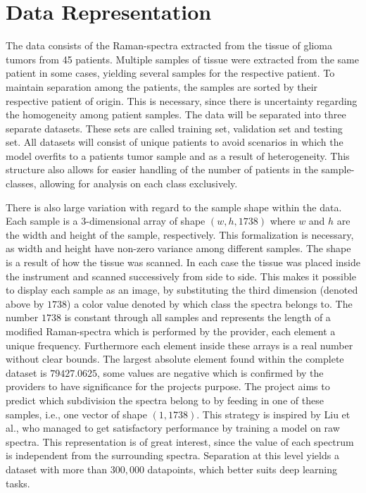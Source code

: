 \section{Data Representation}
The data consists of the Raman-spectra extracted from the tissue of glioma tumors from 45 patients. Multiple samples of tissue were extracted from the same patient in some cases, yielding several samples for the respective patient. To maintain separation among the patients, the samples are sorted by their respective patient of origin. This is necessary, since there is uncertainty regarding the homogeneity among patient samples. The data will be separated into three separate datasets. These sets are called training set, validation set and testing set. All datasets will consist of unique patients to avoid scenarios in which the model overfits to a patients tumor sample and as a result of heterogeneity. This structure also allows for easier handling of the number of patients in the sample-classes, allowing for analysis on each class exclusively. 

There is also large variation with regard to the sample shape within the data. Each sample is a 3-dimensional array of shape $(w, h, 1738)$ where $w$ and $h$ are the width and height of the sample, respectively. This formalization is necessary, as width and height have non-zero variance among different samples. The shape is a result of how the tissue was scanned. In each case the tissue was placed inside the instrument and scanned successively from side to side. This makes it possible to display each sample as an image, by substituting the third dimension (denoted above by $1738$) a color value denoted by which class the spectra belongs to. The number $1738$ is constant through all samples and represents the length of a modified Raman-spectra which is performed by the provider, each element a unique frequency. Furthermore each element inside these arrays is a real number without clear bounds. The largest absolute element found within the complete dataset is $79427.0625$, some values are negative which is confirmed by the providers to have significance for the projects purpose. The project aims to predict which subdivision the spectra belong to by feeding in one of these samples, i.e., one vector of shape $(1, 1738)$. This strategy is inspired by Liu et al.\cite{liu2017deep}, who managed to get satisfactory performance by training a model on raw spectra. This representation is of great interest, since the value of each spectrum is independent from the surrounding spectra. Separation at this level yields a dataset with more than $300,000$ datapoints, which better suits deep learning tasks.

